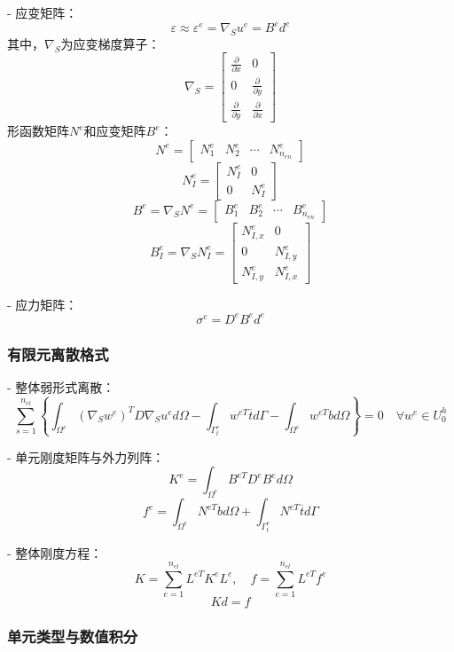 \documentclass{article}
\begin{document}
- 应变矩阵：
  \[
  \varepsilon \approx \varepsilon^{e} = \nabla_{S} u^{e} = B^{e} d^{e}
  \]
  其中，$\nabla_{S}$为应变梯度算子：
  \[
  \nabla_{S} = \left[\begin{array}{cc}\frac{\partial}{\partial x} & 0 \\ 0 & \frac{\partial}{\partial y} \\ \frac{\partial}{\partial y} & \frac{\partial}{\partial x}\end{array}\right]
  \]
  形函数矩阵$N^{e}$和应变矩阵$B^{e}$：
  \[
  N^{e} = \left[\begin{array}{llll}N_{1}^{e} & N_{2}^{e} & \cdots & N_{n_{en}}^{e}\end{array}\right]
  \]
  \[
  N_{I}^{e} = \left[\begin{array}{cc}N_{I}^{e} & 0 \\ 0 & N_{I}^{e}\end{array}\right]
  \]
  \[
  B^{e} = \nabla_{S} N^{e} = \left[\begin{array}{llll} B_{1}^{e} & B_{2}^{e} & \cdots & B_{n_{en}}^{e} \end{array}\right]
  \]
  \[
  B_{I}^{e} = \nabla_{S} N_{I}^{e} = \left[\begin{array}{cc}N_{I,x}^{e} & 0 \\ 0 & N_{I,y}^{e} \\ N_{I,y}^{e} & N_{I,x}^{e}\end{array}\right]
  \]
  
- 应力矩阵：
  \[
  \sigma^{e} = D^{e} B^{e} d^{e}
  \]

\subsubsection{有限元离散格式}
- 整体弱形式离散：
  \[
  \sum_{s=1}^{n_{el}}\left\{\int_{\Omega^{e}}\left(\nabla_{S} w^{e}\right)^{T} D \nabla_{S} u^{e} d \Omega - \int_{\Gamma_{t}^{e}} w^{e T} \overline{t} d \Gamma - \int_{\Omega^{e}} w^{e T} b d \Omega\right\} = 0 \quad \forall w^{e} \in U_{0}^{h}
  \]
  
- 单元刚度矩阵与外力列阵：
  \[
  K^{e} = \int_{\Omega^{e}} B^{e T} D^{e} B^{e} d \Omega
  \]
  \[
  f^{e} = \int_{\Omega^{e}} N^{e T} b d \Omega + \int_{\Gamma_{t}^{e}} N^{e T} \overline{t} d \Gamma
  \]
  
- 整体刚度方程：
  \[
  K = \sum_{e=1}^{n_{el}} L^{e T} K^{e} L^{e}, \quad f = \sum_{e=1}^{n_{el}} L^{e T} f^{e}
  \]
  \[
  K d = f
  \]

\subsubsection{单元类型与数值积分}
\end{document}

